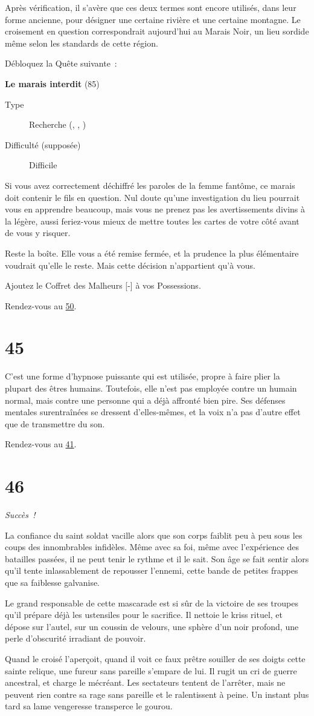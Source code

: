 \documentclass{report}
\newcommand{\gsection}[1]{
    \section{#1}
    \label{section-#1}
}
\newcommand{\glink}[1]{\hyperref[section-#1]{#1}}
\newcommand{\quest}[5]{
    \begin{mdframed}[innertopmargin=0.5cm,innerbottommargin=0.5cm,leftmargin=0.5cm,rightmargin=0.5cm]
        \begin{center}
            \textbf{#1} (#2)
        \end{center}
        \begin{description}
            \item[Type] #3
            \item[Difficulté (supposée)] #4
        \end{description}
        #5
    \end{mdframed}
}
\newcommand{\success}{\emph{Succès !}}
\begin{document}
Après vérification, il s'avère que ces deux termes sont encore utilisés, dans leur forme ancienne, pour désigner une certaine rivière et une certaine montagne. Le croisement en question correspondrait aujourd'hui au Marais Noir, un lieu sordide même selon les standards de cette région.

Débloquez la Quête suivante :

\quest{Le marais interdit}{85}{Recherche (\ankh, \caduceus, \cross)}{Difficile}{
Si vous avez correctement déchiffré les paroles de la femme fantôme, ce marais doit contenir le fils en question. Nul doute qu'une investigation du lieu pourrait vous en apprendre beaucoup, mais vous ne prenez pas les avertissements divins à la légère, aussi feriez-vous mieux de mettre toutes les cartes de votre côté avant de vous y risquer.
}

Reste la boîte. Elle vous a été remise fermée, et la prudence la plus élémentaire voudrait qu'elle le reste. Mais cette décision n'appartient qu'à vous.

Ajoutez le Coffret des Malheurs [-] à vos Possessions. 

Rendez-vous au \glink{50}.

\gsection{45}

C'est une forme d'hypnose puissante qui est utilisée, propre à faire plier la plupart des êtres humains. Toutefois, elle n'est pas employée contre un humain normal, mais contre une personne qui a déjà affronté bien pire. Ses défenses mentales surentraînées se dressent d'elles-mêmes, et la voix n'a pas d'autre effet que de transmettre du son.

Rendez-vous au \glink{41}.

\gsection{46}

\success

La confiance du saint soldat vacille alors que son corps faiblit peu à peu sous les coups des innombrables infidèles. Même avec sa foi, même avec l'expérience des batailles passées, il ne peut tenir le rythme et il le sait. Son âge se fait sentir alors qu'il tente inlassablement de repousser l'ennemi, cette bande de petites frappes que sa faiblesse galvanise.

Le grand responsable de cette mascarade est si sûr de la victoire de ses troupes qu'il prépare déjà les ustensiles pour le sacrifice. Il nettoie le kriss rituel, et dépose sur l'autel, sur un coussin de velours, une sphère d'un noir profond, une perle d'obscurité irradiant de pouvoir.

Quand le croisé l'aperçoit, quand il voit ce faux prêtre souiller de ses doigts cette sainte relique, une fureur sans pareille s'empare de lui. Il rugit un cri de guerre ancestral, et charge le mécréant. Les sectateurs tentent de l'arrêter, mais ne peuvent rien contre sa rage sans pareille et le ralentissent à peine. Un instant plus tard sa lame vengeresse transperce le gourou.
\end{document}
